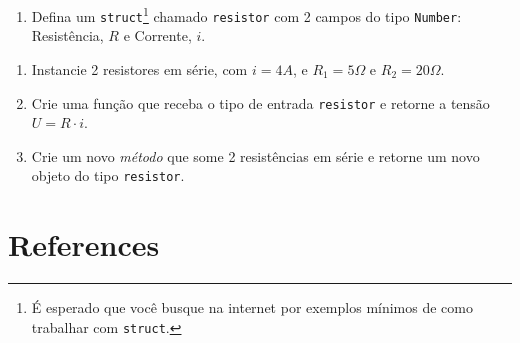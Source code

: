 \documentclass[
  letterpaper,
  DIV=11,
  numbers=noendperiod]{scrreprt}
\providecommand{\tightlist}{%
  \setlength{\itemsep}{0pt}\setlength{\parskip}{0pt}}\usepackage{longtable,booktabs,array}
\newlength{\cslhangindent}
\newlength{\cslentryspacingunit} %
\newenvironment{CSLReferences}[2] %
 {%
  \setlength{\parindent}{0pt}
  \ifodd #1
  \let\oldpar\par
  \def\par{\hangindent=\cslhangindent\oldpar}
  \fi
  \setlength{\parskip}{#2\cslentryspacingunit}
 }%
 {}
\begin{document}
\begin{enumerate}
\def\labelenumi{\arabic{enumi}.}
\setcounter{enumi}{4}
\tightlist
\item
  Defina um \texttt{struct}\footnote{É esperado que você busque na
    internet por exemplos mínimos de como trabalhar com \texttt{struct}.}
  chamado \texttt{resistor} com 2 campos do tipo \texttt{Number}:
  Resistência, \(R\) e Corrente, \(i\).
\end{enumerate}

\begin{enumerate}
\def\labelenumi{\alph{enumi}.}
\tightlist
\item
  Instancie 2 resistores em série, com \(i = 4A\), e \(R_1 = 5\Omega\) e
  \(R_2 = 20\Omega\).
\item
  Crie uma função que receba o tipo de entrada \texttt{resistor} e
  retorne a tensão \(U = R\cdot i\).
\item
  Crie um novo \emph{método} que some 2 resistências em série e retorne
  um novo objeto do tipo \texttt{resistor}.
\end{enumerate}


\hypertarget{references}{%
\chapter*{References}\label{references}}

\hypertarget{refs}{}
\begin{CSLReferences}{0}{0}
\end{CSLReferences}
\end{document}
